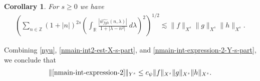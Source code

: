 \documentclass[12pt,reqno]{amsart}
\numberwithin{equation}{section}  %
\newcommand{\rr}{\mathbb{R}}
\newcommand{\zz}{\mathbb{Z}}
\newcommand{\wh}{\widehat}
\newtheorem{corollary}[theorem]{Corollary}
\begin{document}
%
%
\begin{corollary}
\label{ncor:trilinear-estimate2}
	For $s \ge 0$ we have
%
%
\begin{equation}
	\label{ntrilinear-estimate2}
	\begin{split}
		\left( \sum_{n \in \zz} \left (1 + |n| \right )^{2s}  \left ( \int_\rr 
		\frac{|\wh{w_{fgh}}(n, \lambda) |}{1 + | \lambda - n^{2} |}
		 \ d\lambda \right)^2  \right)^{1/2} \lesssim \|f\|_{X^s} \|g\|_{X^s}\|h\|_{X^s}.
	\end{split}
\end{equation}
\end{corollary}
%
%
Combining \eqref{nyu}, \eqref{nmain-int2-est-X-s-part}, and
\eqref{nmain-int-expression-2-Y-s-part}, we conclude that
%
%
%
%
\begin{equation}
	\label{nmain-int2-est}
	\begin{split}
		\|\eqref{nmain-int-expression-2}\|_{Y^s} \le c_{\psi}\|f\|_{X^s} \|g\|_{X^s}\|h\|_{X^s}.
	\end{split}
\end{equation}
%
%
\end{document}
